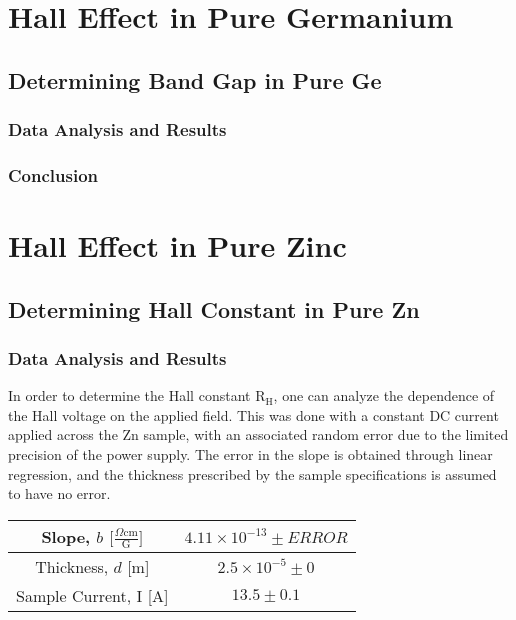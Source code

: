 \documentclass[a4paper]{article}
\begin{document}
\newpage

\section{Hall Effect in Pure Germanium}

\subsection{Determining Band Gap in Pure Ge}

\subsubsection{Data Analysis and Results}

\subsubsection{Conclusion}

\section{Hall Effect in Pure Zinc}

\subsection{Determining Hall Constant in Pure Zn}

\subsubsection{Data Analysis and Results}
In order to determine the Hall constant $\text{R}_\text{H}$, one can analyze the dependence of the Hall voltage on the applied field. This was done with a constant DC current applied across the Zn sample, with an associated random error due to the limited precision of the power supply. The error in the slope is obtained through linear regression, and the thickness prescribed by the sample specifications is assumed to have no error.

\begin{center}
\begin{tabular}{|c|c|}
\hline
Slope, $b$ $\big[  \frac{\Omega \text{cm}}{\text{G}} \big] $ & $4.11 \times 10^{-13} \pm ERROR$ \topVspace \bottomVspace \\
\hline
Thickness, $d$ [m] & $2.5 \times 10^{-5} \pm 0$ \topVspace \bottomVspace \\
\hline
Sample Current, I [A] & $13.5 \pm 0.1$ \topVspace \bottomVspace \\
\hline
\end{tabular}
\label{table:zinc_RH}
\end{center}
\end{document}
